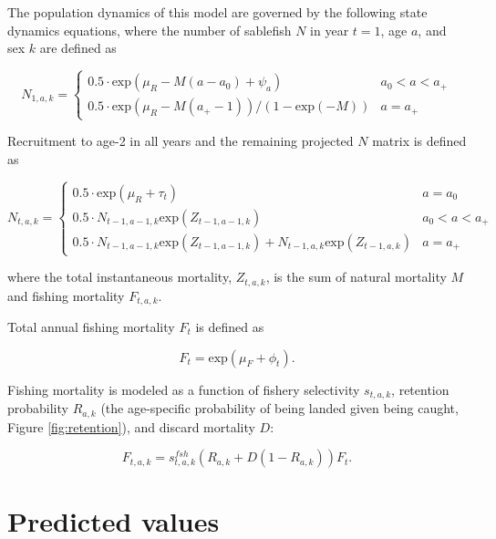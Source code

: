 \documentclass[]{article}
\begin{document}
The population dynamics of this model are governed by the following
state dynamics equations, where the number of sablefish \(N\) in year
\(t=1\), age \(a\), and sex \(k\) are defined as

\begin{equation}
N_{1,a,k} = \left\{ \begin{array}{ll}
0.5\cdot\mbox{exp}(\mu_R-M(a-a_0)+\psi_a) &a_{0}<a<a_{+}\\
0.5\cdot\mbox{exp}(\mu_R-M(a_{+}-1))/(1-\mbox{exp}(-M)) &a=a_{+}
\end{array}\right.
\label{eq:Nmat1}
\end{equation}

Recruitment to age-2 in all years and the remaining projected \(N\)
matrix is defined as

\begin{equation}
N_{t,a,k} = \left\{ \begin{array}{ll}
0.5\cdot\mbox{exp}(\mu_R+\tau_t) &a=a_0\\
0.5\cdot N_{t-1,a-1,k}\mbox{exp}(Z_{t-1,a-1,k}) &a_{0}<a<a_{+}\\
0.5\cdot N_{t-1,a-1,k}\mbox{exp}(Z_{t-1,a-1,k})+N_{t-1,a,k}\mbox{exp}(Z_{t-1,a,k}) &a=a_{+}
\end{array}\right.
\label{eq:Nmat2}
\end{equation}

where the total instantaneous mortality, \(Z_{t,a,k}\), is the sum of
natural mortality \(M\) and fishing mortality \(F_{t,a,k}\).

Total annual fishing mortality \(F_t\) is defined as

\begin{equation}
F_t=\mbox{exp}(\mu_F+\phi_t).
\label{eq:fmort1}
\end{equation}

Fishing mortality is modeled as a function of fishery selectivity
\(s_{t,a,k}\), retention probability \(R_{a,k}\) (the age-specific
probability of being landed given being caught, Figure
\ref{fig:retention}), and discard mortality \(D\):

\begin{equation}
F_{t,a,k}=s_{t,a,k}^{fsh}(R_{a,k}+D(1-R_{a,k}))F_t.
\label{eq:fmort2}
\end{equation}

\section{Predicted values}\label{predicted-values}
\end{document}
